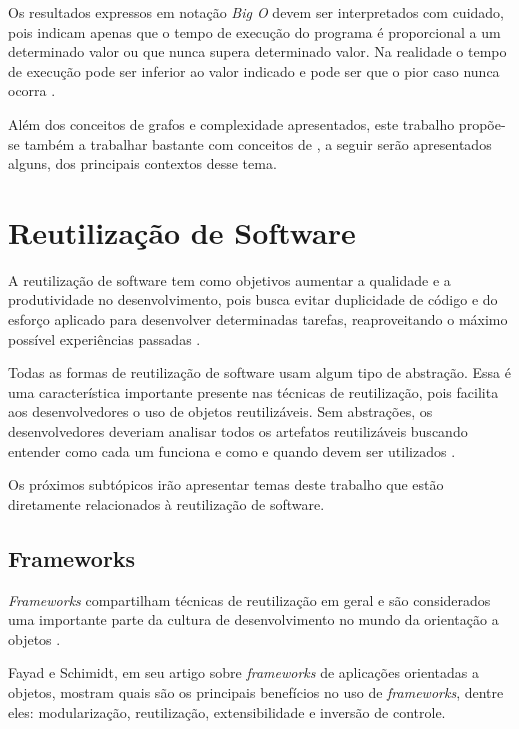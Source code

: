 Os resultados expressos em notação \textit{Big O} devem ser interpretados com cuidado, pois indicam apenas que o tempo de execução do programa é proporcional a um determinado valor ou que nunca supera determinado valor. Na realidade o tempo de execução pode ser inferior ao valor indicado e pode ser que o pior caso nunca ocorra \cite{Junior:2014}.

Além dos conceitos de grafos e complexidade apresentados, este trabalho propõe-se também a trabalhar bastante com conceitos de , a seguir serão apresentados alguns, dos principais contextos desse tema.

\section{Reutilização de Software}
\label{sec:reutilizacao_software}

A reutilização de software tem como objetivos aumentar a qualidade e a produtividade no desenvolvimento, pois busca evitar duplicidade de código e do esforço aplicado para desenvolver determinadas tarefas, reaproveitando o máximo possível experiências passadas \cite{Lucredio:2009}.

Todas as formas de reutilização de software usam algum tipo de abstração.  Essa é uma característica importante presente nas técnicas de reutilização, pois facilita aos desenvolvedores o uso de objetos reutilizáveis. Sem abstrações, os desenvolvedores deveriam analisar todos os artefatos reutilizáveis buscando entender como cada um funciona e como e quando devem ser utilizados \cite{Krueger:1992}.

Os próximos subtópicos irão apresentar temas deste trabalho que estão diretamente relacionados à reutilização de software.

\subsection{Frameworks}

\textit{Frameworks} compartilham técnicas de reutilização em geral e são considerados uma importante parte da cultura de desenvolvimento no mundo da orientação a objetos \cite{Johnson:1997}.

Fayad e Schimidt, em seu artigo \cite{Fayad:Schimidt:1997} sobre \textit{frameworks} de aplicações orientadas a objetos, mostram quais são os principais benefícios no uso de \textit{frameworks}, dentre eles: modularização, reutilização, extensibilidade e inversão de controle.

